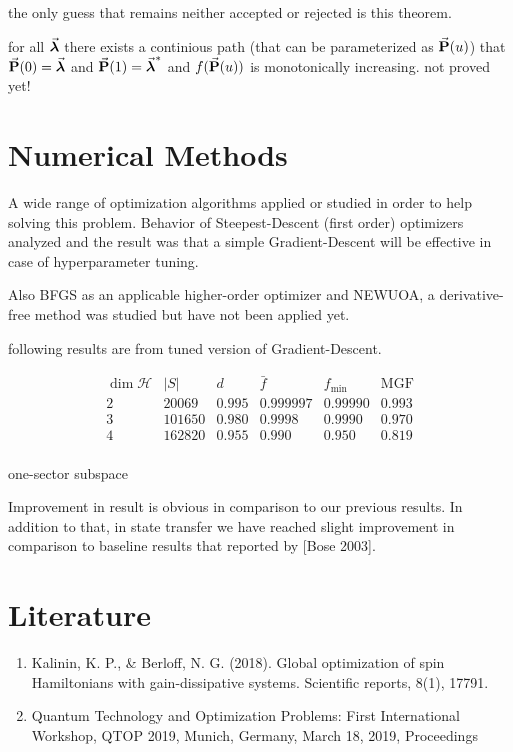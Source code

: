 \documentclass{article}
\begin{document}
the only guess that remains neither accepted or rejected is this theorem.

\begin{theorem}
\label{theor:monotonic}
  for all $\va*{\lambda}$ there exists a continious path (that can be parameterized as $\va{P}(u)$) that $\va{P}(0) = \va*{\lambda}$
and $\va{P}(1) = \va*{\lambda}^*$ and $f(\va{P}(u))$ is monotonically increasing. not proved yet!
\end{theorem}

\section{Numerical Methods}
A wide range of optimization algorithms applied or studied in order to help solving this problem. Behavior of Steepest-Descent (first order) optimizers analyzed and the result was that a simple Gradient-Descent will be effective in case of hyperparameter tuning.

Also BFGS as an applicable higher-order optimizer and NEWUOA, a derivative-free method was studied but have not been applied yet.

following results are from tuned version of Gradient-Descent.
\begin{table}[H]
\[ \begin{array}{c|c|c|c|c||c}
\dim \mathcal{H} & |S| & d & \bar{f} & f_{\min} & \text{MGF} \\ \hline 
2 & 20069 & 0.995 & 0.999997 & 0.99990 & 0.993 \\
3 & 101650 & 0.980 & 0.9998 & 0.9990 & 0.970 \\

4 & 162820 & 0.955 & 0.990 & 0.950 & 0.819 \\
\end{array} \]
\caption{one-sector subspace}
\end{table}

Improvement in result is obvious in comparison to our previous results. In addition to that, in state transfer we have reached slight improvement in comparison to baseline results that reported by [Bose 2003].


\section{Literature}
\begin{enumerate}
\item Kalinin, K. P., \& Berloff, N. G. (2018). Global optimization of spin Hamiltonians with gain-dissipative systems. Scientific reports, 8(1), 17791.
\item Quantum Technology and Optimization Problems: First International Workshop, QTOP 2019, Munich, Germany, March 18, 2019, Proceedings
\end{enumerate}
\end{document}
